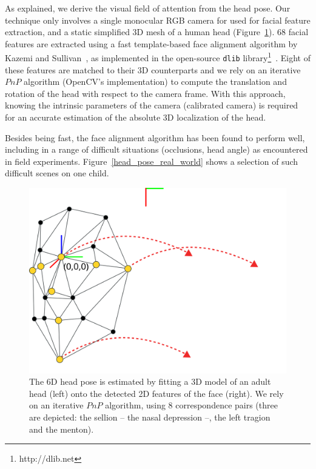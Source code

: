 \documentclass{sig-alternate}
\begin{document}
As explained, we derive the visual field of attention from the head pose. Our
technique only involves a single monocular RGB camera for used for facial
feature extraction, and a static simplified 3D mesh of a human head
(Figure~\ref{head_pose}). 68 facial features are extracted using a fast
template-based face alignment algorithm by Kazemi and
Sullivan~\cite{kazemi2014one}, as implemented in the open-source {\tt dlib}
library\footnote{http://dlib.net}~\cite{dlib09}.  Eight of these features are
matched to their 3D counterparts and we rely on an iterative $PnP$ algorithm
(OpenCV's implementation) to compute the translation and rotation of the head
with respect to the camera frame. With this approach, knowing the intrinsic
parameters of the camera (calibrated camera) is required for an accurate
estimation of the absolute 3D localization of the head.

Besides being fast, the face alignment algorithm has been found to perform well,
including in a range of difficult situations (occlusions, head angle) as
encountered in field experiments.  Figure~\ref{head_pose_real_world} shows a
selection of such difficult scenes on one child.

\begin{figure}[t]
    \centering
    \includegraphics[width=0.9\linewidth]{head_pose}
    \caption{The 6D head pose is estimated by fitting a 3D model of an
        adult head (left) onto the detected 2D features of the face (right). We
        rely on an iterative $PnP$ algorithm, using 8 correspondence pairs
        (three are depicted: the sellion -- the nasal depression --, the left
        tragion and the menton).}

    \label{head_pose}
\end{figure}
\end{document}
